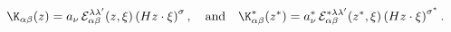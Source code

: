 \begin{equation}\label{eq:dswave}
{\K}_{\alpha\beta}(z)= a_{\nu}\,{\cal
E}_{\alpha\beta}^{\lambda\lambda'}(z,\xi) \left( Hz\cdot
\xi\right)^{\sigma},\quad\mbox{and}\quad
{\K}_{\alpha\beta}^{*}(z^{*})=a_{\nu}^{*}\,{\cal
E}_{\alpha\beta}^{*\lambda\lambda'}(z^{*},\xi) \left( Hz\cdot
\xi\right)^{\sigma^{*}}.
\end{equation}

